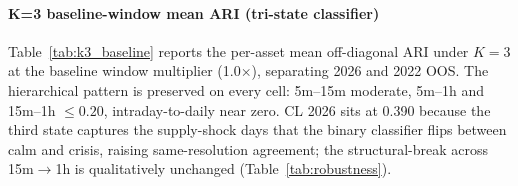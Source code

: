 \documentclass[preprint,12pt,authoryear]{elsarticle}
\newcommand{\CL}{CL}
\begin{document}
\begin{table}[!htbp]
\centering
\small
\setlength{\tabcolsep}{4pt}
\caption{Parameter combinations delivering the minimum and maximum full-sample ARI (2026 panel).}
\label{tab:robustness_extremes}
\medskip
\footnotesize
\end{table}

\paragraph{K=3 baseline-window mean ARI (tri-state classifier)}
Table~\ref{tab:k3_baseline} reports the per-asset mean off-diagonal ARI under $K{=}3$ at the baseline window multiplier (1.0$\times$), separating 2026 and 2022 OOS. The hierarchical pattern is preserved on every cell: 5m--15m moderate, 5m--1h and 15m--1h $\le 0.20$, intraday-to-daily near zero. \CL{} 2026 sits at 0.390 because the third state captures the supply-shock days that the binary classifier flips between calm and crisis, raising same-resolution agreement; the structural-break across 15m$\to$1h is qualitatively unchanged (Table~\ref{tab:robustness}).
\end{document}
